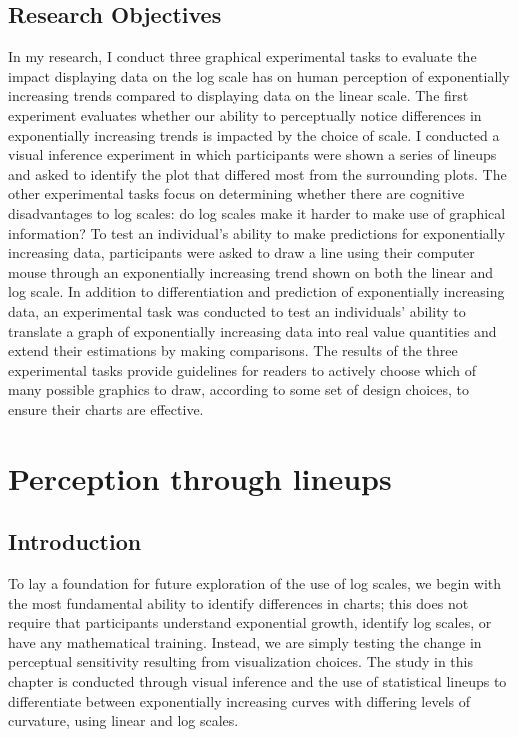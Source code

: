 \documentclass[print]{nuthesis}
\begin{document}
\hypertarget{research-objectives}{%
\section{Research Objectives}\label{research-objectives}}

In my research, I conduct three graphical experimental tasks to evaluate the impact displaying data on the log scale has on human perception of exponentially increasing trends compared to displaying data on the linear scale.
The first experiment evaluates whether our ability to perceptually notice differences in exponentially increasing trends is impacted by the choice of scale. I conducted a visual inference experiment in which participants were shown a series of lineups and asked to identify the plot that differed most from the surrounding plots.
The other experimental tasks focus on determining whether there are cognitive disadvantages to log scales: do log scales make it harder to make use of graphical information?
To test an individual's ability to make predictions for exponentially increasing data, participants were asked to draw a line using their computer mouse through an exponentially increasing trend shown on both the linear and log scale.
In addition to differentiation and prediction of exponentially increasing data, an experimental task was conducted to test an individuals' ability to translate a graph of exponentially increasing data into real value quantities and extend their estimations by making comparisons.
The results of the three experimental tasks provide guidelines for readers to actively choose which of many possible graphics to draw, according to some set of design choices, to ensure their charts are effective.

\hypertarget{lineups}{%
\chapter{Perception through lineups}\label{lineups}}

\hypertarget{introduction}{%
\section{Introduction}\label{introduction}}

To lay a foundation for future exploration of the use of log scales, we begin with the most fundamental ability to identify differences in charts; this does not require that participants understand exponential growth, identify log scales, or have any mathematical training.
Instead, we are simply testing the change in perceptual sensitivity resulting from visualization choices.
The study in this chapter is conducted through visual inference and the use of statistical lineups to differentiate between exponentially increasing curves with differing levels of curvature, using linear and log scales.
\end{document}
